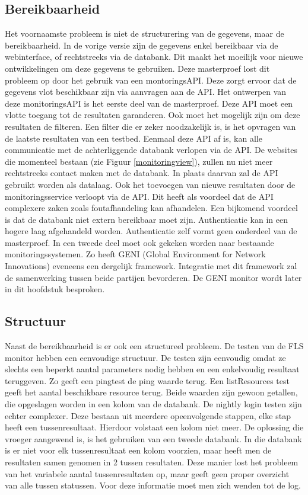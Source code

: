 \subsection{Bereikbaarheid}
\npar
Het voornaamste probleem is niet de structurering van de gegevens, maar de bereikbaarheid. In de vorige versie zijn de gegevens enkel bereikbaar via de webinterface, of rechtstreeks via de databank. Dit maakt het moeilijk voor nieuwe ontwikkelingen om deze gegevens te gebruiken. Deze masterproef lost dit probleem op door het gebruik van een montoringsAPI. Deze zorgt ervoor dat de gegevens vlot beschikbaar zijn via aanvragen aan de API.
\npar
Het ontwerpen van deze monitoringsAPI is het eerste deel van de masterproef. Deze API moet een vlotte toegang tot de resultaten garanderen. Ook moet het mogelijk zijn om deze resultaten de filteren. Een filter die er zeker noodzakelijk is, is het opvragen van de laatste resultaten van een testbed. Eenmaal deze API af is, kan alle communicatie met de achterliggende databank verlopen via de API. De websites die momenteel bestaan (zie Figuur \ref{monitoringview}), zullen nu niet meer rechtstreeks contact maken met de databank. In plaats daarvan zal de API gebruikt worden als datalaag.
\npar
Ook het toevoegen van nieuwe resultaten door de monitoringsservice verloopt via de API. Dit heeft als voordeel dat de API complexere zaken zoals foutafhandeling kan afhandelen. Een bijkomend voordeel is dat de databank niet extern bereikbaar moet zijn. Authenticatie kan in een hogere laag afgehandeld worden. Authenticatie zelf vormt geen onderdeel van de masterproef.
\npar
In een tweede deel moet ook gekeken worden naar bestaande monitoringssystemen. Zo heeft GENI (Global Environment for Network Innovations) eveneens een dergelijk framework. Integratie met dit framework zal de samenwerking tussen beide partijen bevorderen. De GENI monitor wordt later in dit hoofdstuk besproken.

\subsection{Structuur}
\npar
Naast de bereikbaarheid is er ook een structureel probleem. De testen van de FLS monitor hebben een eenvoudige structuur. De testen zijn eenvoudig omdat ze slechts een beperkt aantal parameters nodig hebben en een enkelvoudig resultaat teruggeven. Zo geeft een pingtest de ping waarde terug. Een listResources test geeft het aantal beschikbare resource terug. Beide waarden zijn gewoon getallen, die opgeslagen worden in een kolom van de databank.
\clearpage
\npar
De nightly login testen zijn echter complexer. Deze bestaan uit meerdere opeenvolgende stappen, elke stap heeft een tussenresultaat. Hierdoor volstaat een kolom niet meer. De oplossing die vroeger aangewend is, is het gebruiken van een tweede databank. In die databank is er niet voor elk tussenresultaat een kolom voorzien, maar heeft men de resultaten samen genomen in 2 tussen resultaten. Deze manier lost het probleem van het variabele aantal tussenresultaten op, maar geeft geen proper overzicht van alle tussen statussen. Voor deze informatie moet men zich wenden tot de log.
